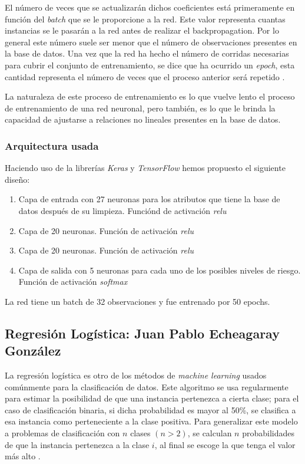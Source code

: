 \documentclass[journal]{IEEEtran}                                                          %
\begin{document}
            El número de veces que se actualizarán dichos coeficientes está primeramente en función del \emph{batch} que se le proporcione a la red. Este valor representa cuantas instancias se le pasarán a la red antes de realizar el backpropagation. Por lo general este número suele ser menor que el número de observaciones presentes en la base de datos. Una vez que la red ha hecho el número de corridas necesarias para cubrir el conjunto de entrenamiento, se dice que ha ocurrido un \emph{epoch}, esta cantidad representa el número de veces que el proceso anterior será repetido \cite{geron-2019} \cite{team-2022}.

            La naturaleza de este proceso de entrenamiento es lo que vuelve lento el proceso de entrenamiento de una red neuronal, pero también, es lo que le brinda la capacidad de ajustarse a relaciones no lineales presentes en la base de datos.

            \subsubsection{Arquitectura usada}

            Haciendo uso de la librerías \emph{Keras} y \emph{TensorFlow} hemos propuesto el siguiente diseño:
            \begin{enumerate}
                \item Capa de entrada con 27 neuronas para los atributos que tiene la base de datos después de su limpieza. Funciónd de activación \emph{relu}
                \item Capa de 20 neuronas. Función de activación \emph{relu}
                \item Capa de 20 neuronas. Función de activación \emph{relu}
                \item Capa de salida con 5 neuronas para cada uno de los posibles niveles de riesgo. Función de activación \emph{softmax}
            \end{enumerate}

            La red tiene un batch de 32 observaciones y fue entrenado por 50 epochs.

        \subsection{Regresión Logística: Juan Pablo Echeagaray González} \label{logistic}

            La regresión logística es otro de los métodos de \emph{machine learning} usados comúnmente para la clasificación de datos. Este algoritmo se usa regularmente para estimar la posibilidad de que una instancia pertenezca a cierta clase; para el caso de clasificación binaria, si dicha probabilidad es mayor al 50\%, se clasifica a esa instancia como perteneciente a la clase positiva. Para generalizar este modelo a problemas de clasificación con $n$ clases $(n > 2)$, se calculan $n$ probabilidades de que la instancia pertenezca a la clase $i$, al final se escoge la que tenga el valor más alto \cite{geron-2019} \cite{sci-kit-learn-no-dateB}.
\end{document}
